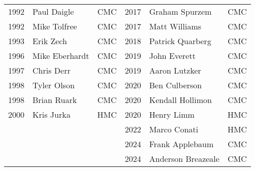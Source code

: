 \begin{table}[H]
{\begin{tabular}{c l c | c l c}
1992 & Paul Daigle & CMC & 2017 & Graham Spurzem & CMC \\
1992 & Mike Tolfree & CMC & 2017 & Matt Williams & CMC \\
1993 & Erik Zech & CMC & 2018 & Patrick Quarberg & CMC \\
1996 & Mike Eberhardt & CMC & 2019 & John Everett & CMC \\
1997 & Chris Derr & CMC & 2019 & Aaron Lutzker & CMC \\
1998 & Tyler Olson & CMC & 2020 & Ben Culberson & CMC \\
1998 & Brian Ruark & CMC & 2020 & Kendall Hollimon & CMC \\
2000 & Kris Jurka & HMC & 2020 & Henry Limm & HMC \\
& & & 2022 & Marco Conati & HMC \\
& & & 2024 & Frank Applebaum & CMC \\
& & & 2024 & Anderson Breazeale & CMC \\
\bottomrule
\end{tabular}%
}
\end{table}

